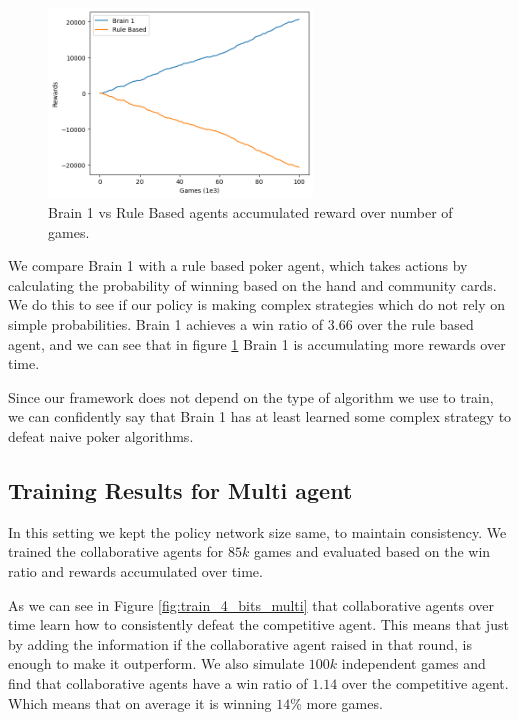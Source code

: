 \documentclass{article}
\begin{document}
\begin{figure}[h]
    \centering
    \includegraphics[width=7cm]{./images/single_rule.png}
    \caption{Brain 1 vs Rule Based agents accumulated reward over number of games.}
    \label{fig:single_rule}
\end{figure}

We compare Brain 1 with a rule based poker agent, which takes actions by calculating the probability of winning based on the hand and community cards. We do this to see if our policy is making complex strategies which do not rely on simple probabilities. Brain 1 achieves a win ratio of $3.66$ over the rule based agent, and we can see that in figure \ref{fig:single_rule} Brain 1 is accumulating more rewards over time.



Since our framework does not depend on the type of algorithm we use to train, we can confidently say that Brain 1 has at least learned some complex strategy to defeat naive poker algorithms.

\subsection{Training Results for Multi agent} %
In this setting we kept the policy network size same, to maintain consistency. We trained the collaborative agents for $85k$ games and evaluated based on the win ratio and rewards accumulated over time. 

As we can see in Figure \ref{fig:train_4_bits_multi} that collaborative agents over time learn how to consistently defeat the competitive agent. This means that just by adding the information if the collaborative agent raised in that round, is enough to make it outperform. We also simulate $100k$ independent games and find that collaborative agents have a win ratio of $1.14$ over the competitive agent. Which means that on average it is winning $14\%$ more games.
\end{document}
